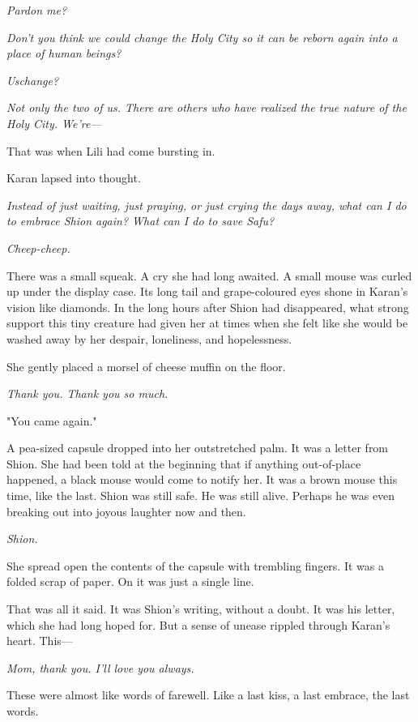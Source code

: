 \emph{Pardon me?}

\emph{Don't you think we could change the Holy City so it can be reborn
again into a place of human beings?}

\emph{Us\el change\el ?}

\emph{Not only the two of us. There are others who have realized the
true nature of the Holy City. We're---}

That was when Lili had come bursting in.

Karan lapsed into thought.

\emph{Instead of just waiting, just praying, or just crying the days
away, what can I do to embrace Shion again? What can I do to save Safu?}

\emph{Cheep-cheep.}

There was a small squeak. A cry she had long awaited. A small mouse was
curled up under the display case. Its long tail and grape-coloured eyes
shone in Karan's vision like diamonds. In the long hours after Shion had
disappeared, what strong support this tiny creature had given her at
times when she felt like she would be washed away by her despair,
loneliness, and hopelessness.

She gently placed a morsel of cheese muffin on the floor.

\emph{Thank you. Thank you so much.}

"You came again."

A pea-sized capsule dropped into her outstretched palm. It was a letter
from Shion. She had been told at the beginning that if anything
out-of-place happened, a black mouse would come to notify her. It was a
brown mouse this time, like the last. Shion was still safe. He was still
alive. Perhaps he was even breaking out into joyous laughter now and
then.

\emph{Shion.}

She spread open the contents of the capsule with trembling fingers. It
was a folded scrap of paper. On it was just a single line.


That was all it said. It was Shion's writing, without a doubt. It was
his letter, which she had long hoped for. But a sense of unease rippled
through Karan's heart. This---

\emph{Mom, thank you. I'll love you always.}

These were almost like words of farewell. Like a last kiss, a last
embrace, the last words.

